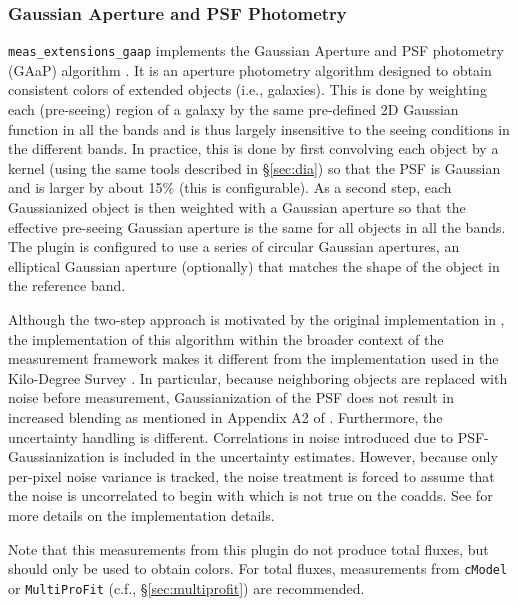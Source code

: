 \subsubsection{Gaussian Aperture and PSF Photometry}
\label{sec:gaap}

\texttt{meas\_extensions\_gaap} implements the Gaussian Aperture and PSF photometry (GAaP) algorithm \citep{2008A&A...482.1053K}.
It is an aperture photometry algorithm designed to obtain consistent colors of extended objects (i.e., galaxies).
This is done by weighting each (pre-seeing) region of a galaxy by the same pre-defined 2D Gaussian function in all the bands and is thus largely insensitive to the seeing conditions in the different bands.
In practice, this is done by first convolving each object by a kernel (using the same tools described in \S\ref{sec:dia}) so that the PSF is Gaussian and is larger by about 15\% (this is configurable).
As a second step, each Gaussianized object is then weighted with a Gaussian aperture so that the effective pre-seeing Gaussian aperture is the same for all objects in all the bands.
The plugin is configured to use a series of circular Gaussian apertures, an elliptical Gaussian aperture (optionally) that matches the shape of the object in the reference band.

Although the two-step approach is motivated by the original implementation in \citet{2008A&A...482.1053K}, the implementation of this algorithm within the broader context of the measurement framework makes it different from the implementation used in the Kilo-Degree Survey \citep[KiDS;][]{2024A&A...686A.170W}.
In particular, because neighboring objects are replaced with noise before measurement, Gaussianization of the PSF does not result in increased blending as mentioned in Appendix A2 of \citet{2015MNRAS.454.3500K}.
Furthermore, the uncertainty handling is different.
Correlations in noise introduced due to PSF-Gaussianization is included in the uncertainty estimates.
However, because only per-pixel noise variance is tracked, the noise treatment is forced to assume that the noise is uncorrelated to begin with which is not true on the coadds.
See \citet{DMTN-190} for more details on the implementation details.

Note that this measurements from this plugin do not produce total fluxes, but should only be used to obtain colors.
For total fluxes, measurements from \texttt{cModel} or \texttt{MultiProFit} (c.f., \S\ref{sec:multiprofit}) are recommended.
